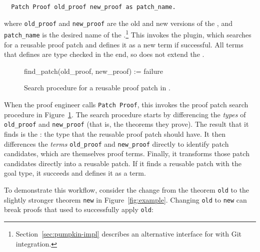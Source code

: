 \begin{lstlisting}
  Patch Proof old_proof new_proof as patch_name. 
\end{lstlisting}
where \lstinline{old_proof} and \lstinline{new_proof} are the old and new versions of the ,
and \lstinline{patch_name} is the desired name of the .\footnote{Section~\ref{sec:pumpkin-impl} describes an alternative interface for \sysname with Git integration.} This invokes the \sysname plugin, which searches for a reusable proof patch
and defines it as a new term if successful.
All terms that \sysname defines are type checked in the end, so \sysname does not extend the .

\begin{figure}
\begin{algorithmic}
\renewcommand{\thealgorithm}{}
\footnotesize
\STATE \hspace{-0.5cm} \footnotesize{find\_patch(old\_proof, new\_proof) :=}
    \STATE {}
    \STATE {}
      \STATE {}
    \ENDIF
    \RETURN failure
\end{algorithmic}
\caption{Search procedure for a reusable proof patch in \sysname.}
\label{alg:patching}	
\end{figure}

When the proof engineer calls \lstinline{Patch Proof}, this invokes the proof patch search procedure in Figure~\ref{alg:patching}.
The search procedure starts by differencing the \textit{types} of \lstinline{old_proof} and \lstinline{new_proof}
(that is, the theorems they prove).
The result that it finds is the : the type that the reusable proof patch should have.
It then differences the \textit{terms} \lstinline{old_proof} and \lstinline{new_proof} directly to identify patch candidates,
which are themselves proof terms.
Finally, it transforms those patch candidates directly into a reusable patch.
If it finds a reusable patch with the goal type, it succeeds and defines it as a term.

To demonstrate this workflow, consider the change from the theorem \lstinline{old} to the slightly stronger theorem \lstinline{new} in Figure~\ref{fig:example}.
Changing \lstinline{old} to \lstinline{new} can break proofs that used to successfully apply \lstinline{old}:

